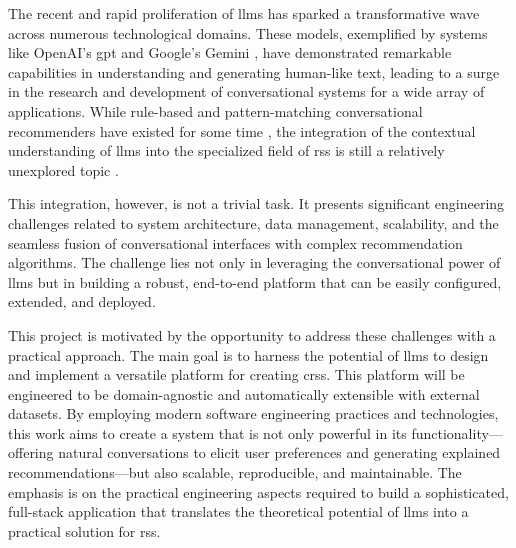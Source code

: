The recent and rapid proliferation of \acp{llm} has sparked a transformative wave across numerous technological domains. These models, exemplified by systems like OpenAI's \ac{gpt} \cite{CHATGPT} and Google's Gemini \cite{GEMINI}, have demonstrated remarkable capabilities in understanding and generating human-like text, leading to a surge in the research and development of conversational systems for a wide array of applications. While rule-based and pattern-matching conversational recommenders have existed for some time \cite{SOTA-CRS}, the integration of the contextual understanding of \acp{llm} into the specialized field of \acl{rs}s is still a relatively unexplored topic \cite{SOTA-CRS-LLM}.

This integration, however, is not a trivial task. It presents significant engineering challenges related to system architecture, data management, scalability, and the seamless fusion of conversational interfaces with complex recommendation algorithms. The challenge lies not only in leveraging the conversational power of \acp{llm} but in building a robust, end-to-end platform that can be easily configured, extended, and deployed.

This project is motivated by the opportunity to address these challenges with a practical approach. The main goal is to harness the potential of \acp{llm} to design and implement a versatile platform for creating \acp{crs}. This platform will be engineered to be domain-agnostic and automatically extensible with external datasets. By employing modern software engineering practices and technologies, this work aims to create a system that is not only powerful in its functionality---offering natural conversations to elicit user preferences \cite[Conversational Preference Elicitation]{CHAPTER:RS-HANDBOOK-NLP} and generating explained recommendations---but also scalable, reproducible, and maintainable. The emphasis is on the practical engineering aspects required to build a sophisticated, full-stack application that translates the theoretical potential of \acp{llm} into a practical solution for \acl{rs}s.